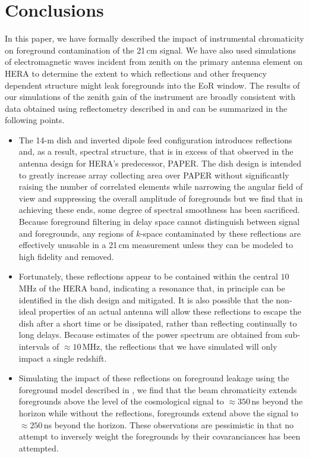 \documentclass[twocolumn]{emulateapj}
\begin{document}
\section{Conclusions}
In this paper, we have formally described the impact of instrumental chromaticity on foreground contamination of the 21\,cm signal. We have also used simulations of electromagnetic waves incident from zenith on the primary antenna element on HERA to determine the extent to which reflections and other frequency dependent structure might leak foregrounds into the EoR window. The results of our simulations of the zenith gain of the instrument are broadly consistent with data obtained using reflectometry described in \citep{Patra:2016} and can be summarized in the following points. 
\begin{itemize}
\item The 14-m dish and inverted dipole feed configuration introduces reflections and, as a result, spectral structure, that is in excess of that observed in the antenna design for HERA's predecessor, PAPER. The dish design is intended to greatly increase array collecting area over PAPER without significantly raising the number of correlated elements while narrowing the angular field of view and suppressing the overall amplitude of foregrounds but we find that in achieving these ends, some degree of spectral smoothness has been sacrificed. Because foreground filtering in delay space cannot distinguish between signal and foregrounds, any regions of $k$-space contaminated by these reflections are effectively unusable in a 21\,cm measurement unless they can be modeled to high fidelity and removed. 

\item Fortunately, these reflections appear to be contained within the central $10$\,MHz of the HERA band, indicating a resonance that, in principle can be identified in the dish design and mitigated. It is also possible that the  non-ideal properties of an actual antenna will allow these reflections to escape the dish after a short time or be dissipated, rather than reflecting continually to long delays. Because estimates of the power spectrum are obtained from sub-intervals of $\approx10$\,MHz, the reflections that we have simulated will only impact a single redshift.

\item Simulating the impact of these reflections on foreground leakage using the foreground model described in \citet{Thyagarajan:2016}, we find that the beam chromaticity extends foregrounds above the level of the cosmological signal to $\approx 350$\,ns beyond the horizon while without the reflections, foregrounds extend above the signal to $\approx 250$\,ns beyond the horizon. These observations are pessimistic in that no attempt to inversely weight the foregrounds by their covaranciances has been attempted. 


\end{itemize}
\end{document}
